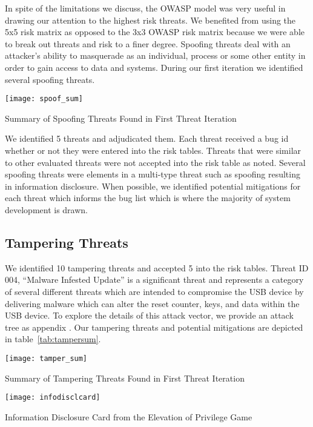 In spite of the limitations we discuss, the OWASP model was very useful in
drawing our attention to the highest risk threats.  We benefited from using the
5x5 risk matrix as opposed to the 3x3 OWASP risk matrix because we were able to
break out threats and risk to a finer degree. Spoofing threats deal with an
attacker's ability to masquerade as an individual, process or some other entity
in order to gain access to data and systems.  During our first iteration we
identified several spoofing threats.

\begin{table*}[ht]
    \centering
    \texttt{[image: spoof\_sum]}
    \caption{Summary of Spoofing Threats Found in First Threat Iteration}
    \label{tab:spoofsum}
\end{table*}
We identified 5 threats and adjudicated them. Each threat received a bug id
whether or not they were entered into the risk tables.  Threats that were
similar to other evaluated threats were not accepted into the risk table as
noted. Several spoofing threats were elements in a multi-type threat such as
spoofing resulting in information disclosure. When possible, we identified
potential mitigations for each threat which informs the bug list which is where
the majority of system development is drawn.

\subsection{Tampering Threats}

We identified 10 tampering threats and accepted 5 into the risk tables. Threat ID 004,
``Malware Infested Update'' is a significant threat and represents a category of
several different threats which are intended to compromise the USB device by
delivering malware which can alter the reset counter, keys, and data within the
USB device. To explore the details of this attack vector, we provide an attack tree as appendix .
Our tampering threats and potential mitigations are depicted in
table~\ref{tab:tampersum}.

\begin{table*}[]
    \centering
    \texttt{[image: tamper\_sum]}
    \caption{Summary of Tampering Threats Found in First Threat Iteration}
    \label{tab:tampersum}
\end{table*}

\begin{marginfigure}[0.25in]%
\centering
  \texttt{[image: infodisclcard]}
  \caption{Information Disclosure Card from the Elevation of Privilege Game}
  \label{fig:spoofcard}
\end{marginfigure}

